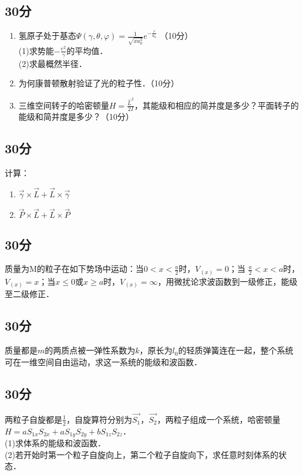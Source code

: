 
\subsection{30分}
\begin{enumerate}
\item 氢原子处于基态$\varPsi(\gamma,\theta,\varphi)=\frac{1}{\sqrt{xa^{3}_{0}}}e^{-\frac{r}{a_0}}$ （10分）\\
(1)求势能$-\frac{e^2}{\gamma}$的平均值．\\
(2)求最概然半径．\\
\item 为何康普顿散射验证了光的粒子性．（10分）\\
\item 三维空间转子的哈密顿量$H=\frac{\hat{L}^2}{2I}$，其能级和相应的简并度是多少？平面转子的能级和简并度是多少？（10分）\\
\end{enumerate}
\subsection{30分}
计算：\\
\begin{enumerate}
\item $\vec{\gamma}\times \vec{L}+ \vec{L}\times \vec{\gamma}$
\item $\vec{P}\times\vec{L}+\vec{L}\times\vec{P}$
\end{enumerate}
\subsection{30分}
质量为M的粒子在如下势场中运动：当$0<x<\frac{a}{2}$时，$V_{(x)}=0$；当 $\frac{a}{2} <x<a$时，$V_{(x)}=x$；当$x \le 0$或$x \ge a$时，$V_{(x)}=\infty$，用微扰论求波函数到一级修正，能级至二级修正．
\subsection{30分}
质量都是$m$的两质点被一弹性系数为$k$，原长为$l_{0}$的轻质弹簧连在一起，整个系统可在一维空间自由运动，求这一系统的能级和波函数．
\subsection{30分}
两粒子自旋都是$\frac{1}{2}$，自旋算符分别为$\vec{S_{1}}$，$\vec{S_{2}}$，两粒子组成一个系统，哈密顿量$H=aS_{1x}S_{2x}+aS_{1y}S_{2y}+bS_{1z}S_{2z}$．\\
(1)求体系的能级和波函数．\\
(2)若开始时第一个粒子自旋向上，第二个粒子自旋向下，求任意时刻体系的状态．\\
